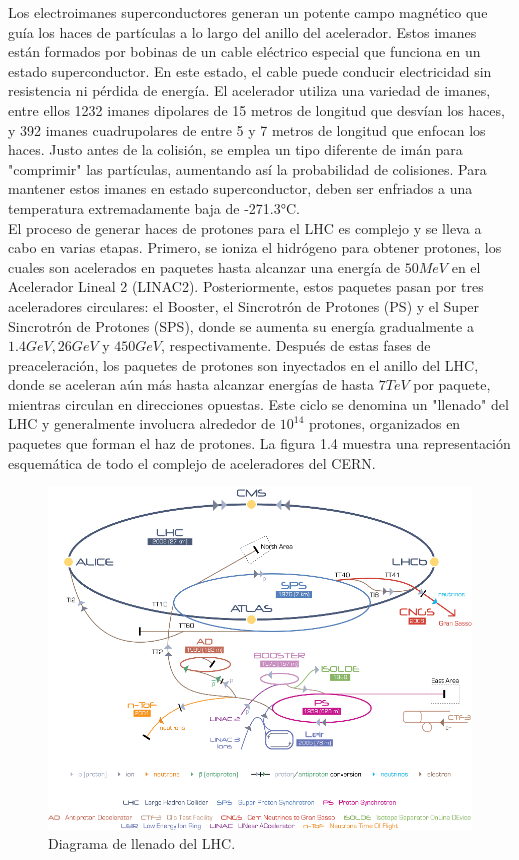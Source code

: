 Los electroimanes superconductores generan un potente campo magnético que guía los haces de partículas a lo largo del anillo del acelerador. Estos imanes están formados por bobinas de un cable eléctrico especial que funciona en un estado superconductor. En este estado, el cable puede conducir electricidad sin resistencia ni pérdida de energía. El acelerador utiliza una variedad de imanes, entre ellos 1232 imanes dipolares de 15 metros de longitud que desvían los haces, y 392 imanes cuadrupolares de entre 5 y 7 metros de longitud que enfocan los haces. Justo antes de la colisión, se emplea un tipo diferente de imán para "comprimir" las partículas, aumentando así la probabilidad de colisiones. Para mantener estos imanes en estado superconductor, deben ser enfriados a una temperatura extremadamente baja de -271.3°C.\\

El proceso de generar haces de protones para el LHC es complejo y se lleva a cabo en varias etapas. Primero, se ioniza el hidrógeno para obtener protones, los cuales son acelerados en paquetes hasta alcanzar una energía de $50 MeV$ en el Acelerador Lineal 2 (LINAC2). Posteriormente, estos paquetes pasan por tres aceleradores circulares: el Booster, el Sincrotrón de Protones (PS) y el Super Sincrotrón de Protones (SPS), donde se aumenta su energía gradualmente a $1.4 GeV, 26 GeV$ y $450 GeV$, respectivamente. Después de estas fases de preaceleración, los paquetes de protones son inyectados en el anillo del LHC, donde se aceleran aún más hasta alcanzar energías de hasta $7 TeV$ por paquete, mientras circulan en direcciones opuestas. Este ciclo se denomina un "llenado" del LHC y generalmente involucra alrededor de \(10^{14}\) protones, organizados en paquetes que forman el haz de protones. La figura 1.4 muestra una representación esquemática de todo el complejo de aceleradores del CERN.

\begin{center}
  \begin{figure}[h]
    \centering
    \includegraphics[scale=.35]{Chapter1/lhc_complex_fig.png}
    \caption[Complejo LHC]{Diagrama de llenado del LHC.}
    \label{lhc_com}
  \end{figure}
\end{center}

